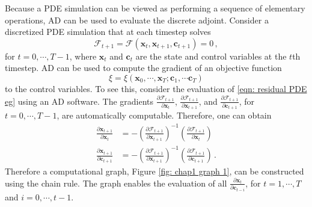 Because a PDE simulation can be viewed as 
performing a sequence of elementary operations, 
AD can be used to evaluate the discrete adjoint.
Consider a discretized PDE simulation that at each timestep solves
\begin{equation}
    \mathcal{F}_{t+1} = \mathcal{F}(\boldsymbol{x}_t, \boldsymbol{x}_{t+1}, \boldsymbol{c}_{t+1})=0\,,
    \label{eqn: residual PDE eg}
\end{equation}
for $t=0, \cdots, T-1$, where $\boldsymbol{x}_t$ and $\boldsymbol{c}_t$ are
the state and control variables at the $t$th timestep. 
AD can be used to compute the gradient of an objective function
$$\xi = \xi(\boldsymbol{x}_0 , \cdots, \boldsymbol{x}_T; \boldsymbol{c}_1, \cdots 
\boldsymbol{c}_{T})$$ 
to the control variables.
To see this, consider the evaluation of \eqref{eqn: residual PDE eg} using an AD software. 
The gradients $\frac{\partial \mathcal{F}_{t+1}}{\partial \boldsymbol{x}_t}$, 
$\frac{\partial \mathcal{F}_{t+1}}{\partial \boldsymbol{x}_{t+1}}$, and
$\frac{\partial \mathcal{F}_{t+1}}{\partial \boldsymbol{c}_{t+1}}$, for
$t=0, \cdots, T-1$, are automatically computable. Therefore, one can obtain
\begin{equation}
    \begin{split}
        \frac{\partial \boldsymbol{x}_{t+1}}{\partial \boldsymbol{x}_t} &=
        - \left(\frac{\partial \mathcal{F}_{t+1}}{\partial \boldsymbol{x}_{t+1}}\right)^{-1}
        \left(\frac{\partial \mathcal{F}_{t+1}}{\partial \boldsymbol{x}_t}\right)\\
        \frac{\partial \boldsymbol{x}_{t+1}}{\partial \boldsymbol{c}_{t+1}} &=
        -\left(\frac{\partial \mathcal{F}_{t+1}}{\partial \boldsymbol{x}_{t+1}}\right)^{-1}
        \left(\frac{\partial \mathcal{F}_{t+1}}{\partial\boldsymbol{c}_{t+1}}\right)\,.
    \end{split}
    \label{eqn: elements for markov graph}
\end{equation}
Therefore a computational graph, Figure \ref{fig: chap1 graph 1},
can be constructed using the chain rule. The graph enables the evaluation of all
$\frac{\partial \boldsymbol{x}_t}{\partial \boldsymbol{c}_{t-i}}$, for $t=1, \cdots, T$
and $i=0, \cdots, t-1$.

